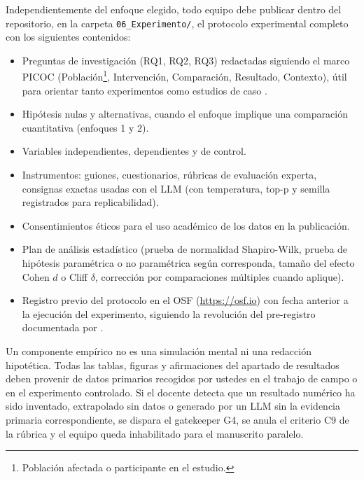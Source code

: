 \documentclass[11pt,a4paper]{article}
\begin{document}
\begin{notabox}[title=Elementos comunes a los tres enfoques que deben incluirse en el protocolo experimental]
Independientemente del enfoque elegido, todo equipo debe publicar dentro del repositorio, en la carpeta \texttt{06\_Experimento/}, el protocolo experimental completo con los siguientes contenidos:
\begin{itemize}
    \item Preguntas de investigación (RQ1, RQ2, RQ3) redactadas siguiendo el marco PICOC (Población\footnote{Población afectada o participante en el estudio.}, Intervención, Comparación, Resultado, Contexto), útil para orientar tanto experimentos como estudios de caso \cite{kitchenham2007guidelines}.
    \item Hipótesis nulas y alternativas, cuando el enfoque implique una comparación cuantitativa (enfoques 1 y 2).
    \item Variables independientes, dependientes y de control.
    \item Instrumentos: guiones, cuestionarios, rúbricas de evaluación experta, consignas exactas usadas con el LLM (con temperatura, top-p y semilla registrados para replicabilidad).
    \item Consentimientos éticos para el uso académico de los datos en la publicación.
    \item Plan de análisis estadístico (prueba de normalidad Shapiro-Wilk, prueba de hipótesis paramétrica o no paramétrica según corresponda, tamaño del efecto Cohen $d$ o Cliff $\delta$, corrección por comparaciones múltiples cuando aplique).
    \item Registro previo del protocolo en el OSF (\url{https://osf.io}) con fecha anterior a la ejecución del experimento, siguiendo la revolución del pre-registro documentada por \cite{nosek2018preregistration}.
\end{itemize}
\end{notabox}

\begin{alertbox}[title=Advertencia específica para el componente empírico]
Un componente empírico no es una simulación mental ni una redacción hipotética. Todas las tablas, figuras y afirmaciones del apartado de resultados deben provenir de datos primarios recogidos por ustedes en el trabajo de campo o en el experimento controlado. Si el docente detecta que un resultado numérico ha sido inventado, extrapolado sin datos o generado por un LLM sin la evidencia primaria correspondiente, se dispara el gatekeeper G4, se anula el criterio C9 de la rúbrica y el equipo queda inhabilitado para el manuscrito paralelo.
\end{alertbox}
\end{document}
